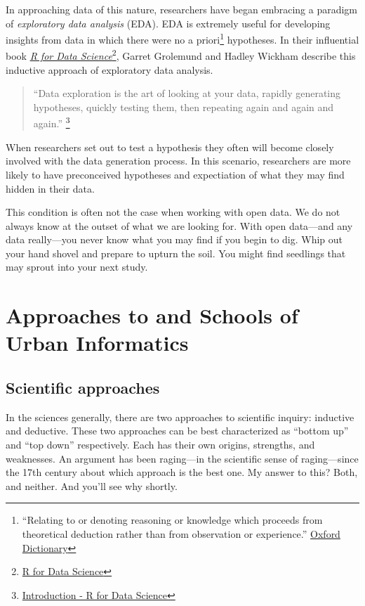 \documentclass[
]{book}
\begin{document}
In approaching data of this nature, researchers have began embracing a paradigm of \emph{exploratory data analysis} (EDA). EDA is extremely useful for developing insights from data in which there were no a priori\footnote{``Relating to or denoting reasoning or knowledge which proceeds from theoretical deduction rather than from observation or experience.'' \href{https://www.lexico.com/definition/a_priori}{Oxford Dictionary}} hypotheses. In their influential book \href{https://r4ds.had.co.nz}{\emph{R for Data Science}}\footnote{\href{https://www.hup.harvard.edu/catalog.php?isbn=9780674975293}{R for Data Science}}, Garret Grolemund and Hadley Wickham describe this inductive approach of exploratory data analysis.

\begin{quote}
``Data exploration is the art of looking at your data, rapidly generating hypotheses, quickly testing them, then repeating again and again and again.'' \footnote{\href{https://r4ds.had.co.nz/explore-intro.html}{Introduction - R for Data Science}}
\end{quote}

When researchers set out to test a hypothesis they often will become closely involved with the data generation process. In this scenario, researchers are more likely to have preconceived hypotheses and expectiation of what they may find hidden in their data.

This condition is often not the case when working with open data. We do not always know at the outset of what we are looking for. With open data---and any data really---you never know what you may find if you begin to dig. Whip out your hand shovel and prepare to upturn the soil. You might find seedlings that may sprout into your next study.

\hypertarget{approaches-to-and-schools-of-urban-informatics}{%
\chapter{Approaches to and Schools of Urban Informatics}\label{approaches-to-and-schools-of-urban-informatics}}

\hypertarget{scientific-approaches}{%
\section{Scientific approaches}\label{scientific-approaches}}

In the sciences generally, there are two approaches to scientific inquiry: inductive and deductive. These two approaches can be best characterized as ``bottom up'' and ``top down'' respectively. Each has their own origins, strengths, and weaknesses. An argument has been raging---in the scientific sense of raging---since the 17th century about which approach is the best one. My answer to this? Both, and neither. And you'll see why shortly.
\end{document}
